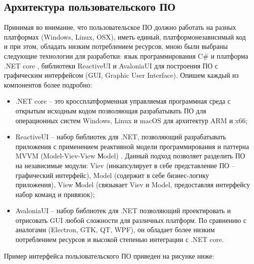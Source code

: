 \subsection{Архитектура пользовательского ПО}
Принимая во внимание, что пользовательское ПО должно работать на разных платформах (Windows, Linux, OSX), иметь единый, платформонезависимый код и при этом, обладать низким потреблением ресурсов, мною были выбраны следующие технологии для разработки: язык программирования C\# и платформа .NET core \cite{lib-dotnetcore}, библиотеки ReactiveUI \cite{lib-reactiveui} и AvaloniaUI \cite{lib-avaloniaui} для построения ПО с графическим интерфейсом (GUI, Graphic User Interface). Опишем каждый из компонентов более подробно:

\begin{itemize}
    \item .NET core -- это кроссплатформенная управляемая программная среда с открытым исходным кодом позволяющая разрабатывать ПО для операционных систем Windows, Linux и macOS для архитектур ARM и x66;
    \item ReactiveUI -- набор библиотек для .NET, позволяющий разрабатывать приложения с применением реактивной модели программирования и паттерна MVVM (Model-Viev-View Мodel) \cite{lib-mvvm}. Данный подход позволяет разделить ПО на независимые модули: Viev (инкапсулирует в себе представление ПО -- графический интерфейс), Model (содержит в себе бизнес-логику приложения), View Мodel (связывает Viev и Model, предоставляя интерфейсу набор команд и привязок);
    \item AvaloniaUI -- набор библиотек для .NET позволяющий проектировать и отрисовать GUI любой сложности для различных платформ. По сравнению с аналогами (Electron, GTK, QT, WPF), он обладает более низким потреблением ресурсов и высокой степенью интеграции с .NET core.
\end{itemize}

Пример интерфейса пользовательского ПО приведен на рисунке ниже:


